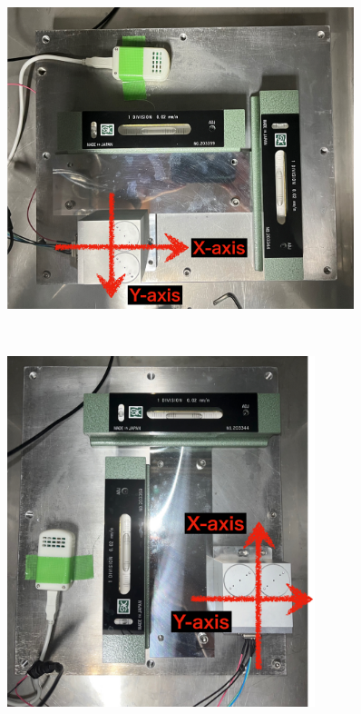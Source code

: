 \documentclass[../../main.tex]{subfiles}
\begin{document}
\begin{figure}[H]
    \centering
    \begin{minipage}[b]{0.5\columnwidth}
        \centering
        \includegraphics[width=0.9\textwidth]{tiltsensor/evalu_kyoto1.pdf}
        \subcaption{}
        \label{fig:evaluation_kyoto1}
    \end{minipage}
    \\
    \begin{minipage}[b]{0.42\columnwidth}
        \centering
        \includegraphics[width=0.8\textwidth]{tiltsensor/evalu_kyoto2.pdf}

\end{minipage}
\end{figure}
\end{document}
